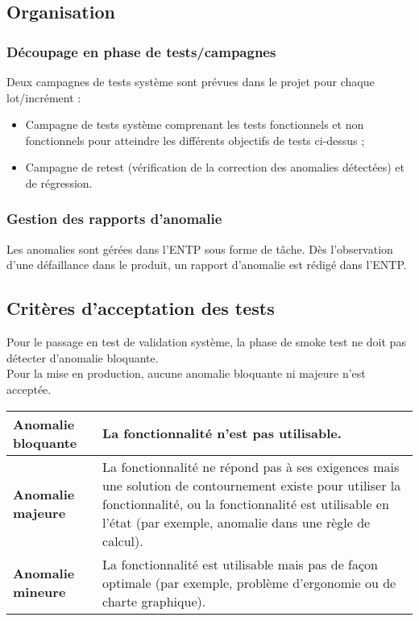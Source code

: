 \subsection{Organisation}
\label{sec:process:orga}

\subsubsection{Découpage en phase de tests/campagnes}
\label{sec:process:orga:decoupage}

Deux campagnes de tests système sont prévues dans le projet pour chaque lot/incrément :
\begin{itemize}
    \item Campagne de tests système comprenant les tests fonctionnels et non fonctionnels pour atteindre les différents objectifs de tests ci-dessus ;
    \item Campagne de retest (vérification de la correction des anomalies détectées) et de régression.
\end{itemize}

\subsubsection{Gestion des rapports d'anomalie}
\label{sec:process:orga:anomalies}

Les anomalies sont gérées dans l'ENTP sous forme de tâche.
Dès l'observation d'une défaillance dans le produit, un rapport d'anomalie est rédigé dans l'ENTP.

\subsection{Critères d'acceptation des tests}
\label{sec:process:accept}

Pour le passage en test de validation système, la phase de smoke test ne doit pas détecter d'anomalie bloquante.\\
Pour la mise en production, aucune anomalie bloquante ni majeure n'est acceptée.

\noindent\begin{longtable}[c]{|p{}|p{}|}
\hline
{\bf Anomalie bloquante} & La fonctionnalité n'est pas utilisable.\\
\hline
{\bf Anomalie majeure} & La fonctionnalité ne répond pas à ses exigences mais une solution de contournement existe pour utiliser la fonctionnalité, ou la fonctionnalité est utilisable en l'état (par exemple, anomalie dans une règle de calcul).\\
\hline
{\bf Anomalie mineure} & La fonctionnalité est utilisable mais pas de façon optimale (par exemple, problème d'ergonomie ou de charte graphique).\\
\hline
\end{longtable}

